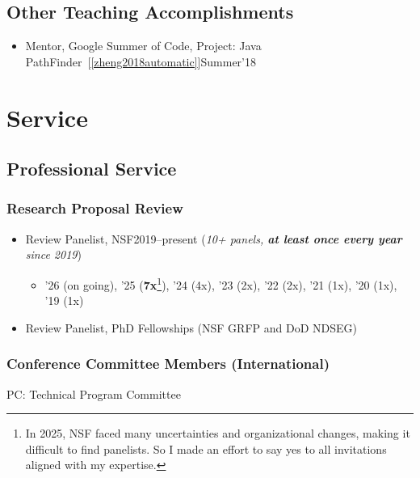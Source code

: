 \documentclass[11pt]{article}
\begin{document}
\subsection{Other Teaching Accomplishments}
\begin{itemize}
    \item Mentor, Google Summer of Code, Project: Java PathFinder~[\ref{zheng2018automatic}]\hfill Summer'18
\end{itemize}

\section{Service}
\subsection{Professional Service}

\subsubsection{Research Proposal Review}
\begin{itemize}
    \item Review Panelist, NSF\hfill 2019--present (\emph{10+ panels, \textbf{at least once every year} since 2019})
    \begin{itemize}
    \item '26 (on going), '25 (\textbf{7x}\footnote{In 2025, NSF faced many uncertainties and organizational changes, making it difficult to find panelists. So I made an effort to say yes to all invitations aligned with my expertise.}), '24 (4x), '23 (2x), '22 (2x), '21 (1x), '20 (1x), '19 (1x)
    \end{itemize}
  \item Review Panelist, PhD Fellowships (NSF GRFP and DoD NDSEG)
\end{itemize}

\subsubsection{Conference Committee Members (International)}

\begin{description}[before=\small]
    \item PC: Technical Program Committee
\end{description}
\end{document}
